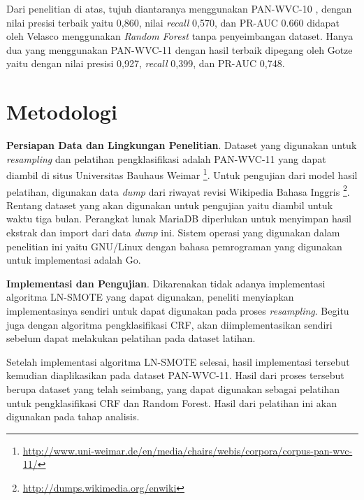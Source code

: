 Dari penelitian di atas, tujuh diantaranya menggunakan PAN-WVC-10
\cite{gotze2014advanced}
\cite{mola2012wikipedia}
\cite{wang2010got}
\cite{adler2010detecting}
\cite{adler2011wikipedia}
\cite{west2011multilingual}
\cite{harpalani2011language}
, dengan nilai presisi terbaik yaitu 0,860, nilai \textit{recall} 0,570, dan PR-AUC 0.660 didapat oleh Velasco menggunakan \textit{Random Forest} tanpa penyeimbangan dataset.
Hanya dua yang menggunakan PAN-WVC-11
\cite{gotze2014advanced}
\cite{west2011multilingual}
dengan hasil terbaik dipegang oleh Gotze yaitu dengan nilai presisi 0,927, \textit{recall} 0,399, dan PR-AUC 0,748.


\section{Metodologi}\label{sec:metodologi}

\textbf{Persiapan Data dan Lingkungan Penelitian}.
Dataset yang digunakan untuk \textit{resampling} dan pelatihan pengklasifikasi adalah PAN-WVC-11 yang dapat diambil di situs Universitas Bauhaus Weimar \footnote{\RaggedRight\url{http://www.uni-weimar.de/en/media/chairs/webis/corpora/corpus-pan-wvc-11/}}.
Untuk pengujian dari model hasil pelatihan, digunakan data \textit{dump} dari riwayat revisi Wikipedia Bahasa Inggris \footnote{\url{http://dumps.wikimedia.org/enwiki}}.
Rentang dataset yang akan digunakan untuk pengujian yaitu diambil untuk waktu tiga bulan.
Perangkat lunak MariaDB diperlukan untuk menyimpan hasil ekstrak dan import dari data \textit{dump} ini.
Sistem operasi yang digunakan dalam penelitian ini yaitu GNU/Linux dengan bahasa pemrograman yang digunakan untuk implementasi adalah Go.

\textbf{Implementasi dan Pengujian}.
Dikarenakan tidak adanya implementasi algoritma LN-SMOTE yang dapat digunakan, peneliti menyiapkan implementasinya sendiri untuk dapat digunakan pada proses \textit{resampling}.
Begitu juga dengan algoritma pengklasifikasi CRF, akan diimplementasikan sendiri sebelum dapat melakukan pelatihan pada dataset latihan.

Setelah implementasi algoritma LN-SMOTE selesai, hasil implementasi tersebut kemudian diaplikasikan pada dataset PAN-WVC-11.
Hasil dari proses tersebut berupa dataset yang telah seimbang, yang dapat digunakan sebagai pelatihan untuk pengklasifikasi CRF dan Random Forest.
Hasil dari pelatihan ini akan digunakan pada tahap analisis.

